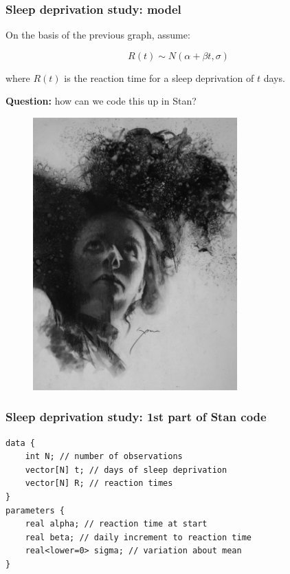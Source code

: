 \documentclass[handout]{beamer}
\begin{document}
\begin{frame}
	\frametitle{Sleep deprivation study: model}
	 On the basis of the previous graph, assume:
	
	\begin{equation}
	R(t)\sim N(\alpha + \beta t,\sigma)
	\end{equation}
	
	 where $R(t)$ is the reaction time for a sleep deprivation of $t$ days. 
	
	 \textbf{Question:} how can we code this up in Stan?
	
	\begin{figure}[ht]
		\includegraphics[width=0.7\textwidth]{./Figures/sleep.jpg}
	\end{figure}
	
\end{frame}

\begin{frame}[fragile]
	\frametitle{Sleep deprivation study: 1st part of Stan code}
\begin{verbatim}
data {
    int N; // number of observations
    vector[N] t; // days of sleep deprivation
    vector[N] R; // reaction times
} 
parameters {
    real alpha; // reaction time at start
    real beta; // daily increment to reaction time
    real<lower=0> sigma; // variation about mean
} 
\end{verbatim}
	
\end{frame}
\end{document}

